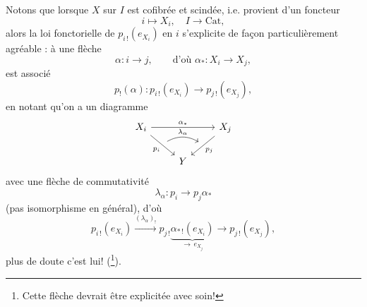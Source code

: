Notons que lorsque $X$ sur $I$ est cofibrée et scindée, i.e. provient d'un foncteur
\[
i \longmapsto X_i, \quad I \longrightarrow \mathrm{Cat},
\]
alors la loi fonctorielle de $p_{i\,!}(e_{X_i})$ en $i$ s'explicite de façon particulièrement agréable : à une flèche
\[
\alpha : i \longrightarrow j, \qquad \text{d'où } \alpha_* : X_i \longrightarrow X_j,
\]
est associé
\[
p_!(\alpha) : p_{i\,!}(e_{X_i}) \longrightarrow p_{j\,!}(e_{X_j}),
\]
en notant qu'on a un diagramme
\[
\begin{tikzcd}
X_i \arrow[rr, "\alpha_*"] \arrow[dr, "p_i"', ""{name=A}] & & X_j \arrow[dl, "p_j", ""'{name=B}] \\
& Y &
\arrow[from=A, to=B, bend left, "\lambda_\alpha"] %
\end{tikzcd}
\]
avec une flèche de commutativité
\[
\lambda_\alpha : p_i \longrightarrow p_j\alpha_*
\]
(pas isomorphisme en général), d'où
\[
p_{i\,!}(e_{X_i}) \xrightarrow{(\lambda_\alpha)_!} p_{j\,!}\underbrace{\alpha_{*\,!}(e_{X_i})}_{\longrightarrow\, e_{X_j}} \longrightarrow p_{j\,!}(e_{X_j}),
\]
plus de doute c'est lui! (\footnote[83]{Cette flèche devrait être explicitée avec soin!}).

